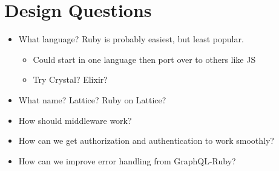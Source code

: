 \documentclass[11pt]{article}
\begin{document}
\section{Design Questions}
\label{sec-3}

\begin{itemize}
\item What language? Ruby is probably easiest, but least popular.
\begin{itemize}
\item Could start in one language then port over to others like JS
\item Try Crystal? Elixir?
\end{itemize}

\item What name? Lattice? Ruby on Lattice?

\item How should middleware work?

\item How can we get authorization and authentication to work smoothly?

\item How can we improve error handling from GraphQL-Ruby?
\end{itemize}
\end{document}
